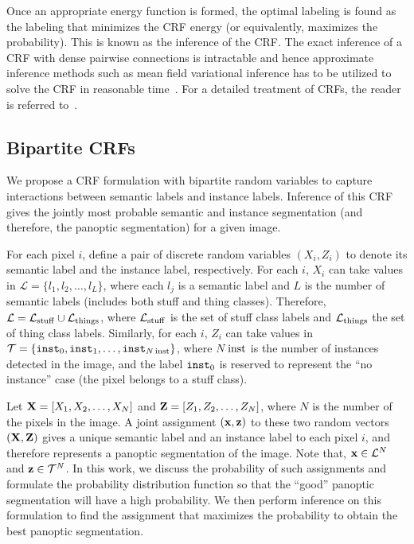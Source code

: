 Once an appropriate energy function is formed, the optimal labeling is found as the labeling that minimizes the CRF energy (or equivalently, maximizes the probability). This is known as the inference of the CRF. The exact inference of a CRF with dense pairwise connections is intractable and hence approximate inference methods such as mean field variational inference has to be utilized to solve the CRF in reasonable time~\cite{densecrf}. For a detailed treatment of CRFs, the reader is referred to~\cite{Koller_book}. 

\subsection{Bipartite CRFs}
\label{sec:body}
We propose a CRF formulation with bipartite random variables to capture interactions between semantic labels and instance labels. Inference of this CRF gives the jointly most probable semantic and instance segmentation (and therefore, the panoptic segmentation) for a given image. 

For each pixel $i$, define a pair of discrete random variables $(X_i, Z_i)$ to denote its semantic label and the instance label, respectively. For each $i$, $X_i$ can take values in $\mathcal{L} = \{l_1, l_2, \dots, l_L\}$, where each $l_j$ is a semantic label and $L$ is the number of semantic labels (includes both stuff and thing classes). Therefore, $\mathcal{L} = \mathcal{L}_{\operatorname{stuff}} \cup \mathcal{L}_{\operatorname{things}}$, where $\mathcal{L}_{\operatorname{stuff}}$ is the set of stuff class labels and $\mathcal{L}_{\operatorname{things}}$ the set of thing class labels. Similarly, for each $i$, $Z_i$ can take values in $\mathcal{T} = \{\texttt{inst}_0, \texttt{inst}_1, \dots, \texttt{inst}_{N\operatorname{inst}} \}$, where $N\operatorname{inst}$ is the number of instances detected in the image, and the label $\texttt{inst}_0$ is reserved to represent the ``no instance'' case (the pixel belongs to a stuff class).  


Let $\mathbf{X} = [X_1, X_2, \dots, X_N ]$ and $\mathbf{Z} = [Z_1, Z_2, \dots, Z_N
]$, where $N$ is the number of the pixels in the image. A joint assignment $(\mathbf{x}, \mathbf{z})$ to these two random vectors $(\mathbf{X}, \mathbf{Z})$ gives a unique semantic label and an instance label to each pixel $i$, and therefore represents a panoptic segmentation of the image. Note that, $\mathbf{x} \in \mathcal{L}^N$ and $\mathbf{z} \in \mathcal{T}^N$. In this work, we discuss the probability of such assignments and formulate the probability distribution function so that the ``good'' panoptic segmentation will have a high probability. We then perform inference on this formulation to find the assignment that maximizes the probability to obtain the best panoptic segmentation.


